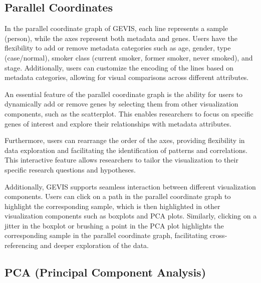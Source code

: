 \documentclass[
	a4paper, %
	10pt, %
	unnumberedsections, %
	twoside, %
]{LTJournalArticle}
\begin{document}
\subsection{Parallel Coordinates}

In the parallel coordinate graph of GEVIS, each line represents a sample (person), while the axes represent both metadata and genes. Users have the flexibility to add or remove metadata categories such as age, gender, type (case/normal), smoker class (current smoker, former smoker, never smoked), and stage. Additionally, users can customize the encoding of the lines based on metadata categories, allowing for visual comparisons across different attributes.

An essential feature of the parallel coordinate graph is the ability for users to dynamically add or remove genes by selecting them from other visualization components, such as the scatterplot. This enables researchers to focus on specific genes of interest and explore their relationships with metadata attributes.

Furthermore, users can rearrange the order of the axes, providing flexibility in data exploration and facilitating the identification of patterns and correlations. This interactive feature allows researchers to tailor the visualization to their specific research questions and hypotheses.

Additionally, GEVIS supports seamless interaction between different visualization components. Users can click on a path in the parallel coordinate graph to highlight the corresponding sample, which is then highlighted in other visualization components such as boxplots and PCA plots. Similarly, clicking on a jitter in the boxplot or brushing a point in the PCA plot highlights the corresponding sample in the parallel coordinate graph, facilitating cross-referencing and deeper exploration of the data.

\subsection{PCA (Principal Component Analysis)}
\end{document}
